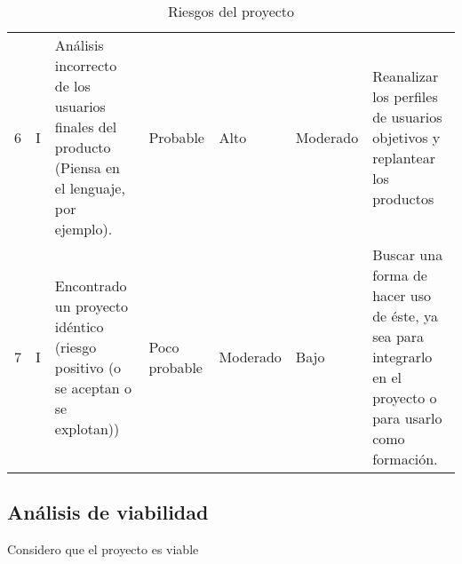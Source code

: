 \begin{table}[H]
{\begin{tabular}{l|l|l|l|l|l|l}
    6           & I             & Análisis incorrecto de los usuarios finales del producto (Piensa en el lenguaje, por ejemplo).                                                     & Probable              & Alto             & Moderado                 & Reanalizar los perfiles de usuarios objetivos y replantear los productos                                                                   \\
    7           & I             & Encontrado un proyecto idéntico (riesgo positivo (o se aceptan o se explotan))                                                                     & Poco probable         & Moderado         & Bajo                     & Buscar una forma de hacer uso de éste, ya sea para integrarlo en el proyecto o para usarlo como formación.                                 \\
    \end{tabular}%
    }
    \caption{Riesgos del proyecto}
    \label{tab:riesgos-descripcion}
    \end{table}




\subsection{Análisis de viabilidad}

Considero que el proyecto es viable